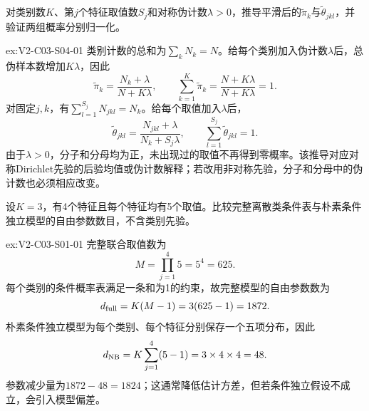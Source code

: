 \begin{SLChapterExercisePairSection}
\begin{exercise}\label{ex:V2-C03-S04-01}
对类别数$K$、第$j$个特征取值数$S_j$和对称伪计数$\lambda>0$，推导平滑后的$\widetilde\pi_k$与$\widetilde\theta_{jkl}$，并验证两组概率分别归一化。
\end{exercise}
\ifSLFullEdition
{}\label{sol:V2-C03-S04-01}
\begin{chapterexercisesolution}{ex:V2-C03-S04-01}
类别计数的总和为$\sum_kN_k=N$。给每个类别加入伪计数$\lambda$后，总伪样本数增加$K\lambda$，因此
\[
\widetilde\pi_k=\frac{N_k+\lambda}{N+K\lambda},\qquad
\sum_{k=1}^{K}\widetilde\pi_k=\frac{N+K\lambda}{N+K\lambda}=1.
\]
对固定$j,k$，有$\sum_{l=1}^{S_j}N_{jkl}=N_k$。给每个取值加入$\lambda$后，
\[
\widetilde\theta_{jkl}=\frac{N_{jkl}+\lambda}{N_k+S_j\lambda},\qquad
\sum_{l=1}^{S_j}\widetilde\theta_{jkl}=1.
\]
由于$\lambda>0$，分子和分母均为正，未出现过的取值不再得到零概率。该推导对应对称Dirichlet先验的后验均值或伪计数解释；若改用非对称先验，分子和分母中的伪计数也必须相应改变。
\end{chapterexercisesolution}
\fi

\SLLectureSupplementExercises

\begin{exercise}\label{ex:V2-C03-S01-01}
设$K=3$，有4个特征且每个特征均有5个取值。比较完整离散类条件表与朴素条件独立模型的自由参数数目，不含类别先验。
\end{exercise}
\ifSLFullEdition
{}\label{sol:V2-C03-S01-01}
\begin{chapterexercisesolution}{ex:V2-C03-S01-01}
完整联合取值数为
\[
M=\prod_{j=1}^{4}5=5^4=625.
\]
每个类别的条件概率表满足一条和为1的约束，故完整模型的自由参数数为
\[
d_{\rm full}=K(M-1)=3(625-1)=1872.
\]
朴素条件独立模型为每个类别、每个特征分别保存一个五项分布，因此
\[
d_{\rm NB}
=K\sum_{j=1}^{4}(5-1)
=3\times4\times4
=48.
\]
参数减少量为$1872-48=1824$；这通常降低估计方差，但若条件独立假设不成立，会引入模型偏差。
\end{chapterexercisesolution}
\fi


\end{SLChapterExercisePairSection}
